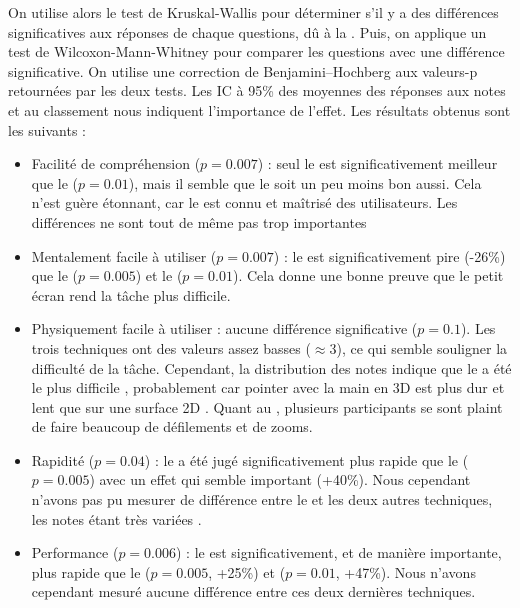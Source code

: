 On utilise alors le test de Kruskal-Wallis pour déterminer s'il y a des différences significatives aux réponses de chaque questions, dû à la . Puis, on applique un test de Wilcoxon-Mann-Whitney pour comparer les questions avec une différence significative. On utilise une correction de Benjamini–Hochberg aux valeurs-p retournées par les deux tests. Les IC à 95\% des moyennes des réponses aux notes  et au classement  nous indiquent l'importance de l'effet. Les résultats obtenus sont les suivants :
\begin{itemize}
  \item Facilité de compréhension ($p = \num{0.007}$) : seul le  est significativement meilleur que le  ($p = \num{0.01}$), mais il semble que le  soit un peu moins bon aussi. Cela n'est guère étonnant, car le  est connu et maîtrisé des utilisateurs. Les différences ne sont tout de même pas trop importantes
  \item Mentalement facile à utiliser ($p = \num{0.007}$) : le  est significativement pire (-26\%) que le  ($p = \num{0.005}$) et le  ($p = \num{0.01}$). Cela donne une bonne preuve que le petit écran rend la tâche plus difficile.
  \item Physiquement facile à utiliser : aucune différence significative ($p = \num{0.1}$). Les trois techniques ont des valeurs assez basses ($\approx$3), ce qui semble souligner la difficulté de la tâche. Cependant, la distribution des notes indique que le  a été le plus difficile , probablement car pointer avec la main en 3D est plus dur et lent que sur une surface 2D \citep{Argelaguet2013}. Quant au , plusieurs participants se sont plaint de faire beaucoup de défilements et de zooms.
  \item Rapidité ($p = \num{0.04}$) : le  a été jugé significativement plus rapide que le  ($p = \num{0.005}$) avec un effet qui semble important (+40\%). Nous cependant n'avons pas pu mesurer de différence entre le  et les deux autres techniques, les notes étant très variées .
  \item Performance ($p = \num{0.006}$) : le  est significativement, et de manière importante, plus rapide que le  ($p = \num{0.005}$, +25\%) et  ($p = \num{0.01}$, +47\%). Nous n'avons cependant mesuré aucune différence entre ces deux dernières techniques.

\end{itemize}
